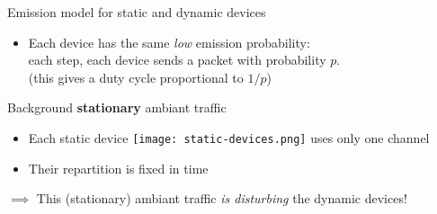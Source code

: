 \begin{frameO}[Hypotheses ($1/2$)]

    \begin{colorblock}{Emission model for static and dynamic devices}

        \begin{itemize}
            \item
                  Each device has the same \emph{low} emission probability: \\
                  each step, each device sends a packet with probability \(p\).
                  \\
                  \hfill{}\small{(this gives a duty cycle proportional to $1/p$)}
        \end{itemize}

    \end{colorblock}

    \vspace*{20pt}

    \begin{lightblock}{Background \textbf{stationary} ambiant traffic}

        \begin{itemize}
            \item
                  Each static device \texttt{[image: static-devices.png]} uses only one channel
            \item
                  Their repartition is fixed in time
        \end{itemize}

        \(\implies\) This (stationary) ambiant traffic \emph{is disturbing} the dynamic devices!
    \end{lightblock}

\end{frameO}


